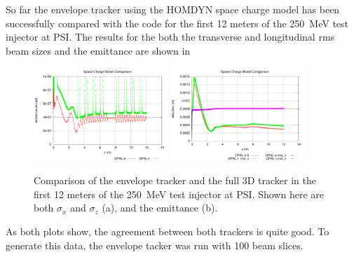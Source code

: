 So far the envelope tracker using the HOMDYN space charge model has
been successfully compared with the \opalt code for the first 12 meters
of the \SI{250}{\mega\electronvolt} test injector at PSI. The results for the both the
transverse and longitudinal rms beam sizes and the emittance are shown in
%
\begin{figure}[ht!]            \label{fig:secondIB}
    \begin{center}
     \includegraphics[width=0.45\textwidth]{figures/EMcompare}
      \includegraphics[width=0.45\textwidth]{figures/RMScompare}
    \end{center}
    \caption{%
    \label{fig:psiInjectorTest}
        Comparison of the \opalenv envelope tracker and the full 3D \opalt tracker
     in the first 12 meters of the \SI{250}{\mega\electronvolt} test injector at PSI. Shown here are
     both $\sigma_x$ and $\sigma_z$ (a), and the emittance (b).
     }%
\end{figure}
%
As both plots show, the agreement between both trackers is quite good. To
generate this data, the envelope tacker was run with 100 beam slices.